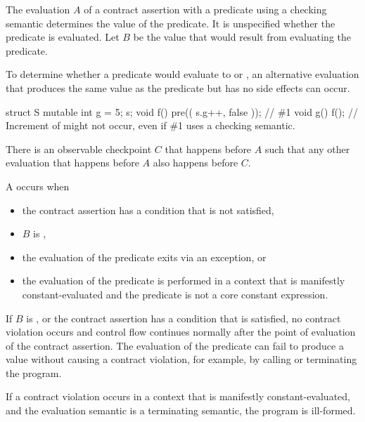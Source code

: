 \pnum
The evaluation $A$ of a contract assertion
with a predicate
using a checking semantic
determines the value of the predicate.
It is unspecified
whether the predicate is evaluated.
Let $B$ be the value that would result from evaluating the predicate.
\begin{note}
To determine whether a predicate would evaluate
to  or ,
an alternative evaluation
that produces the same value as the predicate
but has no side effects
can occur.
\begin{example}
\begin{codeblock}
struct S {
  mutable int g = 5;
} s;
void f()
  pre(( s.g++, false ));    // \#1
void g()
{
  f();  // Increment of  might not occur, even if \#1 uses a checking semantic.
}
\end{codeblock}
\end{example}
\end{note}

\pnum
There is an observable checkpoint $C$
that happens before $A$
such that any other evaluation
that happens before $A$
also happens before $C$.

\pnum
A  occurs when
\begin{itemize}
\item
the contract assertion has a condition
that is not satisfied,
\item
$B$ is ,
\item
the evaluation of the predicate
exits via an exception, or
\item
the evaluation of the predicate
is performed in a context that is
manifestly constant-evaluated
and the predicate
is not a core constant expression.
\end{itemize}

\begin{note}
If $B$ is ,
or the contract assertion has a condition
that is satisfied,
no contract violation occurs and
control flow continues normally
after the point of evaluation of the contract assertion.
The evaluation of the predicate
can fail to produce a value
without causing a contract violation,
for example,
by calling 
or terminating the program.
\end{note}

\pnum
{}%
If a contract violation occurs
in a context that is manifestly constant-evaluated,
and the evaluation semantic is
a terminating semantic,
the program is ill-formed.

